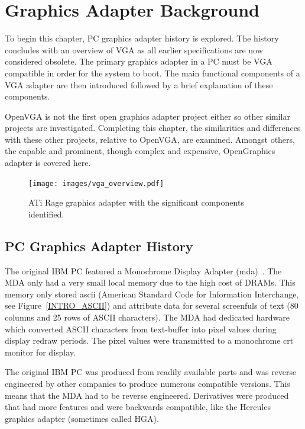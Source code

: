 \chapter{Graphics Adapter Background}
\label{BACKGROUND}

To begin this chapter, PC graphics adapter history is explored. The history
concludes with an overview of VGA as all earlier specifications are now
considered obsolete. The primary graphics adapter in a PC must be VGA compatible
in order for the system to boot. The main functional components of a VGA adapter
are then introduced followed by a brief explanation of these components.

OpenVGA is not the first open graphics adapter project either so other
similar projects are investigated. Completing this chapter, the similarities and
differences with these other projects, relative to OpenVGA, are examined. Amongst
others, the capable and prominent, though complex and expensive, OpenGraphics
adapter is covered here.


\begin{figure}[h!]
\begin{center}
\texttt{[image: images/vga\_overview.pdf]}
\caption[ATi Rage graphics adpater]{ATi Rage graphics adapter with the
significant components identified.}
\end{center}
\label{INTRO_ATi_Rage}
\end{figure}


\section{PC Graphics Adapter History}
The original IBM PC featured a Monochrome Display Adapter (\gls{mda})~\cite{VGA_Programmers}. The MDA
only had a very small local memory due to the high cost of DRAMs. This memory
only stored \gls{ascii} (American Standard Code for Information
Interchange, see Figure~\ref{INTRO_ASCII}) and attribute data for
several screenfuls of text (80 columns and 25 rows of ASCII characters). The MDA
had dedicated hardware which converted ASCII characters from text-buffer into
pixel values during display redraw periods. The pixel values were transmitted to
a monochrome \gls{crt} monitor for
display.

The original IBM PC was produced from readily available parts and was reverse
engineered by other companies to produce numerous compatible versions. This means
that the MDA had to be reverse engineered. Derivatives were produced that had
more features and were backwards compatible, like the Hercules graphics adapter
(sometimes called HGA).

